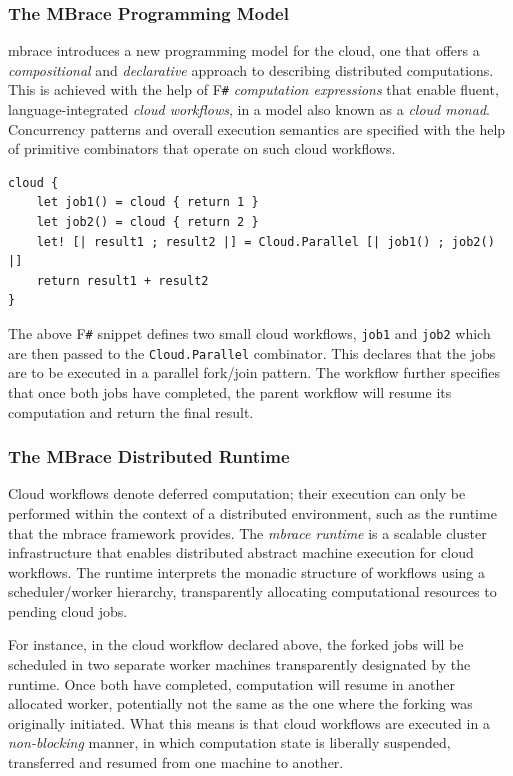 \documentclass[9pt,a4paper]{article}
\newcommand{\mbrace}{mbrace}
\newcommand{\Mbrace}{\mbrace}
\newcommand{\TitularMbrace}{MBrace}
\newcommand{\fsharp}{F\texttt \#}
\begin{document}
\subsubsection*{The \TitularMbrace{} Programming Model}

\Mbrace{} introduces a new programming model for the cloud, one that offers a 
\emph{compositional} and \emph{declarative} approach to describing distributed 
computations. This is achieved with the help of \fsharp{} \emph{computation expressions} 
that enable fluent, language-integrated \emph{cloud workflows}, in a model also known
as a \emph{cloud monad}. Concurrency patterns and overall execution semantics are specified 
with the help of primitive combinators that operate on such cloud workflows.
%
\begin{lstlisting}
cloud {
    let job1() = cloud { return 1 }
    let job2() = cloud { return 2 }
    let! [| result1 ; result2 |] = Cloud.Parallel [| job1() ; job2() |]	
    return result1 + result2
}
\end{lstlisting}
The above \fsharp{} snippet defines two small cloud workflows, \texttt{job1} and
\texttt{job2} which are then passed to the \texttt{Cloud.Parallel}
combinator. This declares that the jobs are to be executed in a parallel
fork/join pattern. The workflow further specifies that once both jobs have
completed, the parent workflow will resume its computation and return the final
result.
%

\subsubsection*{The \TitularMbrace{} Distributed Runtime}

Cloud workflows denote deferred computation; their execution can only be performed within
the context of a distributed environment, such as the runtime that the \mbrace{}
framework provides. The \emph{\mbrace{} runtime} is a scalable cluster infrastructure that
enables distributed abstract machine execution for cloud workflows.
The runtime interprets the monadic structure of workflows using a scheduler/worker hierarchy, 
transparently allocating computational resources to pending cloud jobs.

For instance, in the cloud workflow declared above, the forked jobs will be
scheduled in two separate worker machines transparently designated by the
runtime. Once both have completed, computation will resume in another allocated
worker, potentially not the same as the one where the forking was originally
initiated. What this means is that cloud workflows are executed in a
\emph{non-blocking} manner, in which computation state is liberally suspended,
transferred and resumed from one machine to another.
\end{document}
